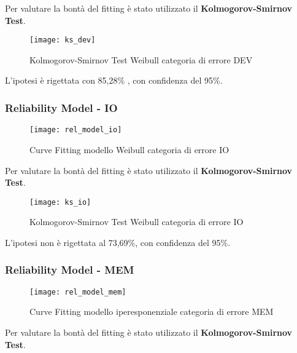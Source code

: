 Per valutare la bontà del fitting è stato utilizzato il \textbf{Kolmogorov-Smirnov Test}.\\

\begin{figure}[!htbp]
  \centering
  \texttt{[image: ks\_dev]}
  \caption{Kolmogorov-Smirnov Test Weibull categoria di errore DEV}
  \label{ffda_ks_dev}
\end{figure}

L'ipotesi è rigettata con 85,28\% , con confidenza del 95\%.\\

\clearpage

\subsubsection*{Reliability Model - IO}

\begin{figure}[!htbp]
  \centering
  \texttt{[image: rel\_model\_io]}
  \caption{Curve Fitting modello Weibull categoria di errore IO}
  \label{ffda_rel_model_io}
\end{figure}

Per valutare la bontà del fitting è stato utilizzato il \textbf{Kolmogorov-Smirnov Test}.\\

\begin{figure}[!htbp]
  \centering
  \texttt{[image: ks\_io]}
  \caption{Kolmogorov-Smirnov Test Weibull categoria di errore IO}
  \label{ffda_ks_io}
\end{figure}

L'ipotesi non è rigettata al 73,69\%, con confidenza del 95\%.\\

\clearpage
\subsubsection*{Reliability Model - MEM}

\begin{figure}[!htbp]
  \centering
  \texttt{[image: rel\_model\_mem]}
  \caption{Curve Fitting modello iperesponenziale categoria di errore MEM}
  \label{ffda_rel_model_mem}
\end{figure}

Per valutare la bontà del fitting è stato utilizzato il \textbf{Kolmogorov-Smirnov Test}.\\

